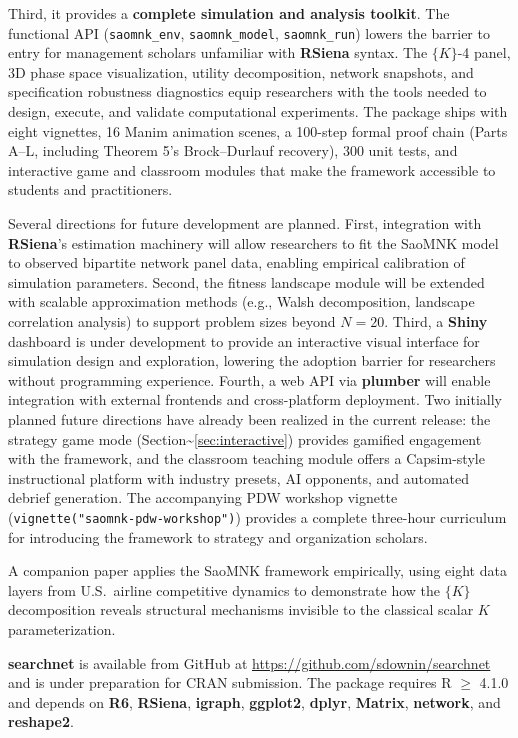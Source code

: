 \documentclass[
]{article}
\begin{document}
Third, it provides a \textbf{complete simulation and analysis toolkit}.
The functional API (\texttt{saomnk\_env}, \texttt{saomnk\_model},
\texttt{saomnk\_run}) lowers the barrier to entry for management
scholars unfamiliar with \textbf{RSiena} syntax. The \(\{K\}\)-4 panel,
3D phase space visualization, utility decomposition, network snapshots,
and specification robustness diagnostics equip researchers with the
tools needed to design, execute, and validate computational experiments.
The package ships with eight vignettes, 16 Manim animation scenes, a
100-step formal proof chain (Parts A--L, including Theorem 5's
Brock--Durlauf recovery), 300 unit tests, and interactive game and
classroom modules that make the framework accessible to students and
practitioners.

Several directions for future development are planned. First,
integration with \textbf{RSiena}'s estimation machinery will allow
researchers to fit the SaoMNK model to observed bipartite network panel
data, enabling empirical calibration of simulation parameters. Second,
the fitness landscape module will be extended with scalable
approximation methods (e.g., Walsh decomposition, landscape correlation
analysis) to support problem sizes beyond \(N = 20\). Third, a
\textbf{Shiny} dashboard is under development to provide an interactive
visual interface for simulation design and exploration, lowering the
adoption barrier for researchers without programming experience. Fourth,
a web API via \textbf{plumber} will enable integration with external
frontends and cross-platform deployment. Two initially planned future
directions have already been realized in the current release: the
strategy game mode (Section\textasciitilde{}\ref{sec:interactive})
provides gamified engagement with the framework, and the classroom
teaching module offers a Capsim-style instructional platform with
industry presets, AI opponents, and automated debrief generation. The
accompanying PDW workshop vignette
(\texttt{vignette("saomnk-pdw-workshop")}) provides a complete
three-hour curriculum for introducing the framework to strategy and
organization scholars.

A companion paper \citep{downing2026architecture} applies the SaoMNK
framework empirically, using eight data layers from U.S.~airline
competitive dynamics to demonstrate how the \(\{K\}\) decomposition
reveals structural mechanisms invisible to the classical scalar \(K\)
parameterization.

\textbf{searchnet} is available from GitHub at
\url{https://github.com/sdownin/searchnet} and is under preparation for
CRAN submission. The package requires \textsf{R} \(\geq\) 4.1.0 and
depends on \textbf{R6}, \textbf{RSiena}, \textbf{igraph},
\textbf{ggplot2}, \textbf{dplyr}, \textbf{Matrix}, \textbf{network}, and
\textbf{reshape2}.
\end{document}
